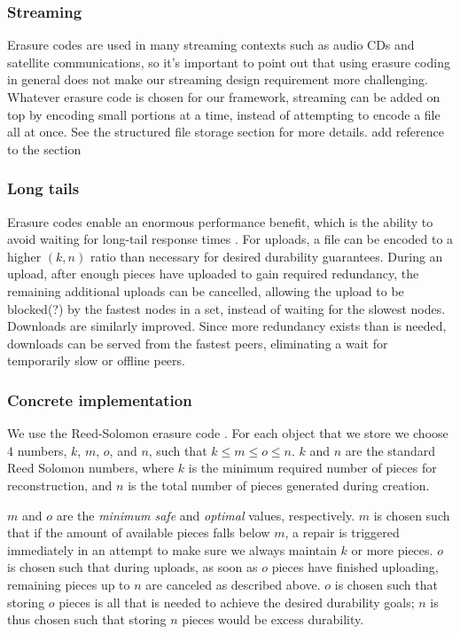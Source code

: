 \documentclass[a4paper,10pt]{article} \usepackage[utf8]{inputenc}
\newcommand{\bs}[1]{{\color{red}#1}}
\begin{document}
\subsubsection{Streaming}

Erasure codes are used in many streaming contexts such as audio CDs and
satellite communications, so it's important to point out that using erasure
coding in general does not make our streaming design requirement more
challenging. Whatever erasure code is chosen for our framework, streaming can be
added on top by encoding small portions at a time, instead of attempting to
encode a file all at once. See the structured file storage section for more
details. \bs{add reference to the section}

\subsubsection{Long tails}

Erasure codes enable an enormous performance benefit, which is the ability to
avoid waiting for long-tail response times \cite{tail-at-scale}. For uploads, a
file can be encoded to a higher $(k, n)$ ratio than necessary for desired 
durability
guarantees. During an upload, after enough pieces have uploaded to gain required
redundancy, the remaining additional uploads can be cancelled, allowing the
upload to be blocked\bs{(?)} by the fastest nodes in a set, instead of waiting for the
slowest nodes. Downloads are similarly improved. Since more redundancy exists
than is needed, downloads can be served from the fastest peers, eliminating a
wait for temporarily slow or offline peers.

\subsubsection{Concrete implementation}

We use the Reed-Solomon erasure code \cite{rs}. For each object that we store
we choose 4 numbers, $k$, $m$, $o$, and $n$, such that $k\le m\le o\le n$.
$k$ and $n$ are the standard Reed Solomon numbers, where $k$ is the minimum
required number of pieces for reconstruction, and $n$ is the total number of
pieces generated during creation.

$m$ and $o$ are the {\em minimum safe} and {\em optimal} values, respectively.
$m$ is chosen such that if the amount of available pieces falls below $m$, a
repair is triggered immediately in an attempt to make sure we always maintain
$k$ or more pieces. $o$ is chosen such that during uploads, as soon as $o$
pieces have finished uploading, remaining pieces up to $n$ are canceled as
described above. $o$ is chosen such that storing $o$ pieces is all that is
needed to achieve the desired durability goals; $n$ is thus chosen such that
storing $n$ pieces would be excess durability.
\end{document}
